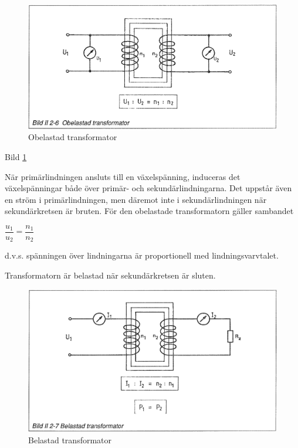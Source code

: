 \begin{figure}[h]
\begin{center}
\includegraphics[width=\textwidth]{images/bild_2_2-06}
\caption{Obelastad transformator}
\label{fig:BildII2-6}
\end{center}
\end{figure}

Bild \ref{fig:BildII2-6}

När primärlindningen ansluts till en växelspänning, induceras det
växelspänningar både över primär- och sekundärlindningarna. Det uppstår även en
ström i primärlindningen, men däremot inte i sekundärlindningen när
sekundärkretsen är bruten. För den obelastade transformatorn gäller sambandet

\(\dfrac{u_1}{u_2} = \dfrac{n_1}{n_2}\)

d.v.s. spänningen över lindningarna är proportionell med lindningsvarvtalet.

Transformatorn är belastad när sekundärkretsen är sluten.

\begin{figure}[h]
\begin{center}
\includegraphics[width=\textwidth]{images/bild_2_2-07}
\caption{Belastad transformator}
\label{fig:BildII2-7}
\end{center}
\end{figure}

